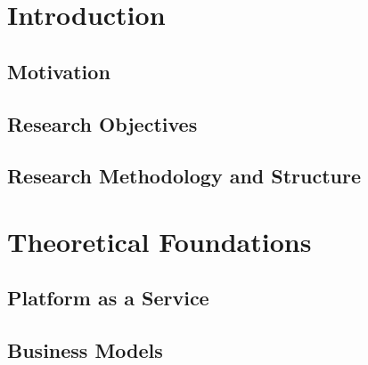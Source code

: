 \chapter{Introduction}

	\section{Motivation}
	
	
	
	\section{Research Objectives}

	\section{Research Methodology and Structure}

\chapter{Theoretical Foundations}\label{ch:tf}

	\section{Platform as a Service}\label{ch:tf:paas}

	\section{Business Models}\label{ch:tf:bm}
	


	
	








